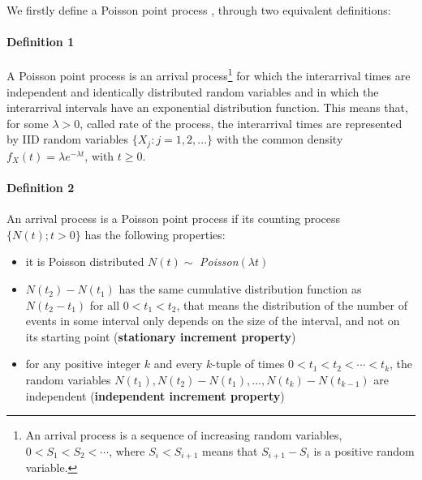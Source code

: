 \documentclass[a4paper]{article}
\begin{document}




We firstly define a Poisson point process \cite{mitpoisson}, through two equivalent definitions:
\paragraph{Definition 1}
A Poisson point process is an arrival process\footnote{An arrival process is a sequence of increasing random variables, $0<S_1<S_2< \cdots$, where $S_i < S_{i+1}$ means that $S_{i+1} - S_i$ is a positive random variable.} for which the interarrival times are independent and identically distributed random variables %
 and in which the interarrival intervals have an exponential distribution function.
This means that, for some $\lambda>0$, called rate of the process, the interarrival times are represented by IID random variables $\{ X_j : j=1,2,...\}$ with the common density $f_X(t) = \lambda e^{- \lambda t}$, with $t \geq 0$.


\paragraph{Definition 2}
An arrival process is a Poisson point process if its counting process $\{ N(t); t>0 \}$ has the following properties:
\begin{itemize}[nolistsep]
\item it is Poisson distributed $N(t) \sim$  \emph{Poisson}$(\lambda t)$
\item $N(t_2)-N(t_1)$ has the same cumulative distribution function as $N(t_2-t_1)$ for all $0<t_1<t_2$, that means the distribution of the number of events in some interval only depends on the size of the interval, and not on its starting point (\textbf{stationary increment property}) 
\item for any positive integer $k$ and every $k$-tuple of times $0<t_1<t_2< \cdots<t_k$, the random variables $N(t_1),N(t_2)-N(t_1),...,N(t_k)-N(t_{k-1})$ are independent (\textbf{independent increment property})
\end{itemize}
\end{document}
